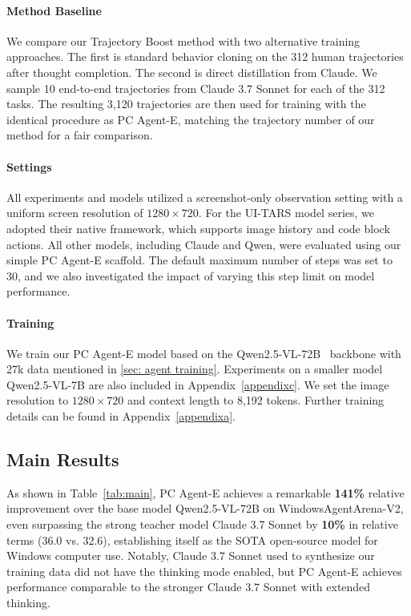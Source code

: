 \documentclass{article} %
\renewcommand{\cite}{\citep}
\begin{document}
\paragraph{Method Baseline}

We compare our Trajectory Boost method with two alternative training approaches. The first is standard behavior cloning on the 312 human trajectories after thought completion. The second is direct distillation from Claude. We sample 10 end-to-end trajectories from Claude 3.7 Sonnet for each of the 312 tasks. 
The resulting 3,120 trajectories are then used for training with the identical procedure as PC Agent-E, matching the trajectory number of our method for a fair comparison.

\paragraph{Settings}

All experiments and models utilized a screenshot-only observation setting with a uniform screen resolution of $1280 \times 720$. For the UI-TARS model series, we adopted their native framework, which supports image history and code block actions. All other models, including Claude and Qwen, were evaluated using our simple PC Agent-E scaffold. The default maximum number of steps was set to 30, and we also investigated the impact of varying this step limit on model performance.

\paragraph{Training}

We train our PC Agent-E model based on the Qwen2.5-VL-72B~\cite{bai2025qwen25vltechnicalreport} backbone with 27k data mentioned in \autoref{sec: agent training}. Experiments on a smaller model Qwen2.5-VL-7B are also included in Appendix~\ref{appendixc}. We set the image resolution to $1280 \times 720$ and context length to 8,192 tokens. Further training details can be found in Appendix~\ref{appendixa}.

\subsection{Main Results}
\label{subsec:main_res}

As shown in Table~\ref{tab:main}, PC Agent-E achieves a remarkable \textbf{141\%} relative improvement over the base model Qwen2.5-VL-72B on WindowsAgentArena-V2, even surpassing the strong teacher model Claude 3.7 Sonnet by \textbf{10\%} in relative terms (36.0 vs. 32.6), establishing itself as the SOTA open-source model for Windows computer use. Notably, Claude 3.7 Sonnet used to synthesize our training data did not have the thinking mode enabled, but PC Agent-E achieves performance comparable to the stronger Claude 3.7 Sonnet with extended thinking.
\end{document}
